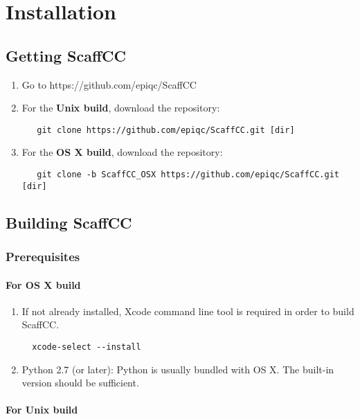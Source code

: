 \chapter{Installation}\label{ch:inst}

\section{Getting ScaffCC}
\begin{enumerate}
  \item Go to https://github.com/epiqc/ScaffCC
  \item For the \textbf{Unix build}, download the repository:
\begin{lstlisting}
   git clone https://github.com/epiqc/ScaffCC.git [dir]
\end{lstlisting}
  \item For the \textbf{OS X build}, download the repository:
\begin{lstlisting}
   git clone -b ScaffCC_OSX https://github.com/epiqc/ScaffCC.git [dir]
\end{lstlisting}
\end{enumerate}


\section{Building ScaffCC}

\subsection{Prerequisites}

\subsubsection{For OS X build}
\begin{enumerate}
  \item If not already installed, Xcode command line tool is required in order to build ScaffCC.
  \begin{lstlisting}
  xcode-select --install
  \end{lstlisting}
  
  \item Python 2.7 (or later): Python is usually bundled with OS X. The built-in version should be sufficient.
\end{enumerate}

\subsubsection{For Unix build}

